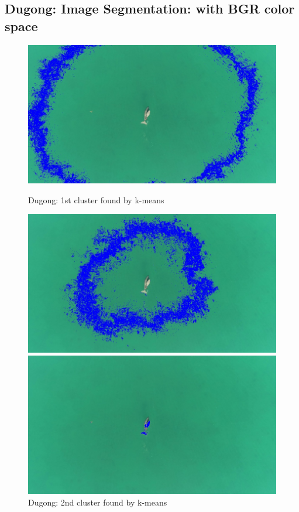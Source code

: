 \documentclass[conference]{IEEEtran}
\begin{document}
\subsection{Dugong: Image Segmentation: with BGR color space}
\begin{figure}[!htb]
  \centering
  \begin{minipage}[b]{0.2\textwidth}
    \includegraphics[width=\textwidth]{../programme/results/Task_4/dugong/BGR/image_1.jpg}
    \caption{Dugong: 1st cluster found by k-means}
    \label{Dugong: 1st cluster found by k-means}
  \end{minipage}
  \hfill
  \begin{minipage}[b]{0.2\textwidth}
    \includegraphics[width=\textwidth]{../programme/results/Task_4/dugong/BGR/image_2.jpg}
    \caption{Dugong: 2nd cluster found by k-means}
    \label{Dugong: 2nd cluster found by k-means}
  \end{minipage}
  \hfill
  \begin{minipage}[b]{0.2\textwidth}
    \includegraphics[width=\textwidth]{../programme/results/Task_4/dugong/BGR/image_3.jpg}

\end{minipage}
\end{figure}
\end{document}
